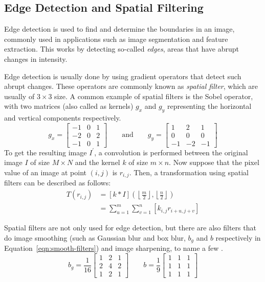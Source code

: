 \subsection{Edge Detection and Spatial Filtering}
Edge detection is used to find and determine the boundaries in an image, commonly used in applications such as image segmentation and feature extraction. This works by detecting so-called \textit{edges}, areas that have abrupt changes in intensity. 

Edge detection is usually done by using gradient operators that detect such abrupt changes. These operators are commonly known as \textit{spatial filter}, which are usually of $3 \times 3$ size. A common example of spatial filters is the Sobel operator, with two matrices (also called as kernels) $g_x$ and $g_y$ representing the horizontal and vertical components respectively.
\begin{equation}
    g_x = 
    \begin{bmatrix}
        -1 & 0 & 1 \\
        -2 & 0 & 2 \\
        -1 & 0 & 1
    \end{bmatrix}
    \qquad\text{and}\qquad
    g_y = 
    \begin{bmatrix}
        1 & 2 & 1 \\
        0 & 0 & 0 \\
        -1 & -2 & -1
    \end{bmatrix}
\end{equation}
To get the resulting image $I^\prime$, a convolution is performed between the original image $I$ of size $M \times N$ and the kernel $k$ of size $m \times n$. Now suppose that the pixel value of an image at point $\left(i,j\right)$ is $r_{i,j}$. Then, a transformation using spatial filters can be described as follows:
\begin{align}
    T\left(r_{i,j}\right) &= \left[k * I\right]\left(\left\lfloor\frac{m}{2}\right\rfloor, \left\lfloor\frac{n}{2}\right\rfloor \right) \\
                         &= \sum_{u=1}^{m} \sum_{v=1}^{n} \left[k_{i,j} r_{i+u, j+v} \right]
\end{align}

Spatial filters are not only used for edge detection, but there are also filters that do image smoothing (such as Gaussian blur and box blur, $b_g$ and $b$ respectively in Equation~\ref{eqn:smooth-filters}) and image sharpening, to name a few \cite{gonzalez_digital_2008}.
\begin{equation}
    \label{eqn:smooth-filters}
    b_g = \frac{1}{16}
    \begin{bmatrix}
        1 & 2 & 1 \\
        2 & 4 & 2 \\
        1 & 2 & 1
    \end{bmatrix}
    \qquad
    b = \frac{1}{9}
    \begin{bmatrix}
        1 & 1 & 1 \\
        1 & 1 & 1 \\
        1 & 1 & 1
    \end{bmatrix}
\end{equation}


